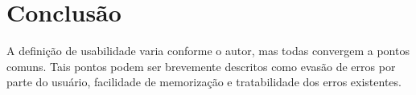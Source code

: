 \documentclass[12pt]{article}
\begin{document}
\section{Conclusão}

A definição de usabilidade varia conforme o autor, mas todas convergem a pontos comuns. Tais pontos podem ser brevemente descritos como evasão de erros por parte do usuário, facilidade de memorização e tratabilidade dos erros existentes.



\end{document}
